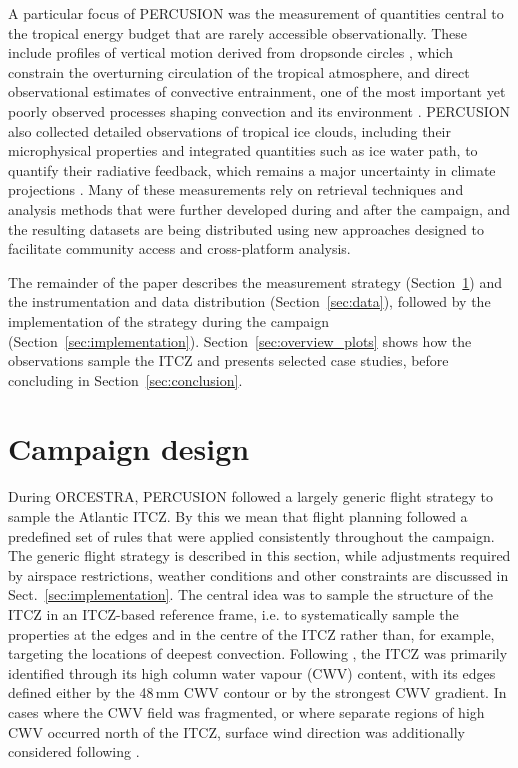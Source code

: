 \documentclass[acp, manuscript]{copernicus}
\begin{document}
A particular focus of PERCUSION was the measurement of quantities central to the tropical energy budget that are rarely accessible observationally. These include profiles of vertical motion derived from dropsonde circles \citep{bonyMeasuringAreaAveragedVertical2019, gloecknerBEACHBarbadosEastern2026}, which constrain the overturning circulation of the tropical atmosphere, and direct observational estimates of convective entrainment, one of the most important yet poorly observed processes shaping convection and its environment \citep{sherwoodSpreadModelClimate2014}. PERCUSION also collected detailed observations of tropical ice clouds, including their microphysical properties and integrated quantities such as ice water path, to quantify their radiative feedback, which remains a major uncertainty in climate projections \citep{sherwoodAssessmentEarthClimate2020}.
Many of these measurements rely on retrieval techniques and analysis methods that were further developed during and after the campaign, and the resulting datasets are being distributed using new approaches designed to facilitate community access and cross-platform analysis.

The remainder of the paper describes the measurement strategy (Section~\ref{sec:campaign_design}) and the instrumentation and data distribution (Section~\ref{sec:data}), followed by the implementation of the strategy during the campaign (Section~\ref{sec:implementation}). Section~\ref{sec:overview_plots} shows how the observations sample the ITCZ and presents selected case studies, before concluding in Section~\ref{sec:conclusion}.

\section{Campaign design}
\label{sec:campaign_design}


During ORCESTRA, PERCUSION followed a largely generic flight strategy to sample the Atlantic ITCZ. 
By this we mean that flight planning followed a predefined set of rules that were applied consistently throughout the campaign. 
The generic flight strategy is described in this section, while adjustments required by airspace restrictions, weather conditions and other constraints are discussed in Sect.~\ref{sec:implementation}.
The central idea was to sample the structure of the ITCZ in an ITCZ-based reference frame, i.e. to systematically sample the properties at the edges and in the centre of the ITCZ rather than, for example, targeting the locations of deepest convection. Following \cite{Mapes2018}, the ITCZ was primarily identified through its high column water vapour (CWV) content, with its edges defined either by the 48\,\unit{mm} CWV contour or by the strongest CWV gradient. In cases where the CWV field was fragmented, or where separate regions of high CWV occurred north of the ITCZ, surface wind direction was additionally considered following \cite{windmillerInnerLifeAtlantic2024}.
\end{document}
